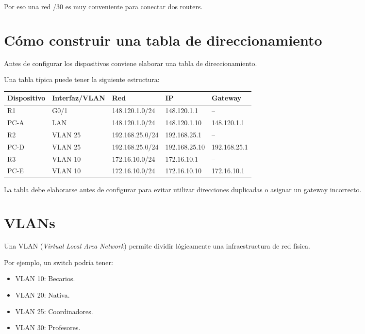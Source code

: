 \documentclass[12pt]{article}
\begin{document}
Por eso una red /30 es muy conveniente para conectar dos routers.


\section{Cómo construir una tabla de direccionamiento}

Antes de configurar los dispositivos conviene elaborar una tabla de
direccionamiento.

Una tabla típica puede tener la siguiente estructura:

\begin{center}
\renewcommand{\arraystretch}{1.2}
\begin{tabular}{|l|l|l|l|l|}
\hline
\textbf{Dispositivo} & \textbf{Interfaz/VLAN} &
\textbf{Red} & \textbf{IP} & \textbf{Gateway} \\
\hline
R1 & G0/1 & 148.120.1.0/24 & 148.120.1.1 & -- \\
PC-A & LAN & 148.120.1.0/24 & 148.120.1.10 & 148.120.1.1 \\
\hline
R2 & VLAN 25 & 192.168.25.0/24 & 192.168.25.1 & -- \\
PC-D & VLAN 25 & 192.168.25.0/24 & 192.168.25.10 & 192.168.25.1 \\
\hline
R3 & VLAN 10 & 172.16.10.0/24 & 172.16.10.1 & -- \\
PC-E & VLAN 10 & 172.16.10.0/24 & 172.16.10.10 & 172.16.10.1 \\
\hline
\end{tabular}
\end{center}

La tabla debe elaborarse antes de configurar para evitar utilizar
direcciones duplicadas o asignar un gateway incorrecto.


\section{VLANs}

Una VLAN (\textit{Virtual Local Area Network}) permite dividir
lógicamente una infraestructura de red física.

Por ejemplo, un switch podría tener:

\begin{itemize}
    \item VLAN 10: Becarios.
    \item VLAN 20: Nativa.
    \item VLAN 25: Coordinadores.
    \item VLAN 30: Profesores.
\end{itemize}
\end{document}

